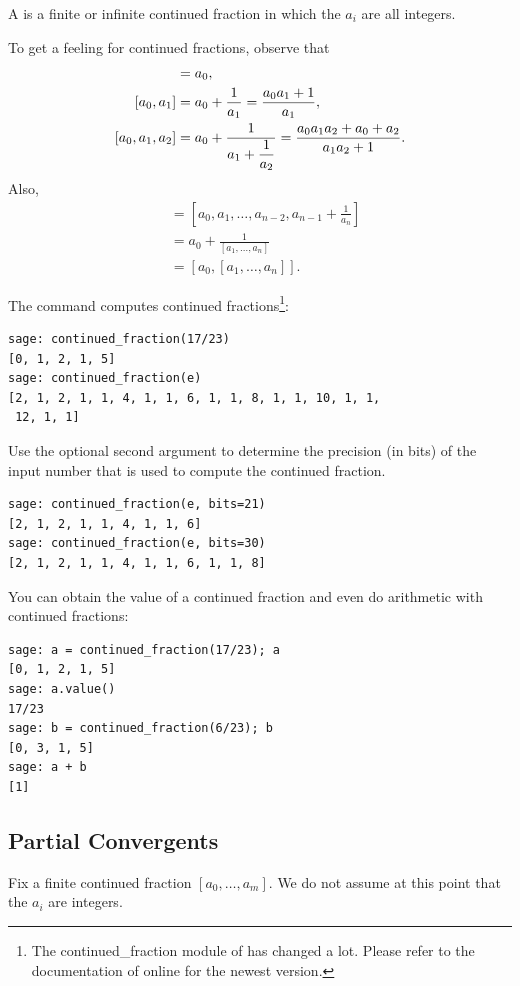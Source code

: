 \begin{definition}
A  is a finite or infinite continued
fraction in which the $a_i$ are all integers.
\end{definition}

To get a feeling for continued fractions, observe that
\begin{align*}
[a_0] &= a_0,\\
[a_0, a_1] &= a_0 + \frac{1}{a_1} = \frac{a_0 a_1 + 1}{a_1},\\
[a_0, a_1, a_2] &= a_0 + \frac{1}{a_1 +\ds \frac{1}{a_2}}
            = \frac{a_0 a_1 a_2 + a_0 + a_2}{a_1 a_2 + 1}.
\end{align*}
Also,
\begin{align*}
  [a_0, a_1, \ldots ,a_{n-1}, a_n] &=
          \left[a_0, a_1, \ldots, a_{n-2}, a_{n-1} + \frac{1}{a_n}\right]\\
        &= a_0 + \frac{1}{[a_1,\ldots, a_n]} \\
        &= [a_0, [a_1,\ldots, a_n]].
\end{align*}

\begin{sg}
The  command  computes
continued fractions\footnote{The continued\_fraction module of \sage
has changed a lot. Please refer to the documentation of \sage online
for the newest version.}:
\begin{verbatim}
sage: continued_fraction(17/23)
[0, 1, 2, 1, 5]
sage: continued_fraction(e)
[2, 1, 2, 1, 1, 4, 1, 1, 6, 1, 1, 8, 1, 1, 10, 1, 1,
 12, 1, 1]
\end{verbatim}
Use the optional second argument  to determine the
precision (in bits) of the input number that is used to compute the
continued fraction.
\begin{verbatim}
sage: continued_fraction(e, bits=21)
[2, 1, 2, 1, 1, 4, 1, 1, 6]
sage: continued_fraction(e, bits=30)
[2, 1, 2, 1, 1, 4, 1, 1, 6, 1, 1, 8]
\end{verbatim}
You can obtain the value of a continued fraction
and even do arithmetic with continued fractions:
\begin{verbatim}
sage: a = continued_fraction(17/23); a
[0, 1, 2, 1, 5]
sage: a.value()
17/23
sage: b = continued_fraction(6/23); b
[0, 3, 1, 5]
sage: a + b
[1]
\end{verbatim}
\end{sg}

\subsection{Partial Convergents}\label{sec:partconv}
%
Fix a finite continued fraction $[a_0,\ldots,a_m]$.  We do not assume
at this point that the $a_i$ are integers.

